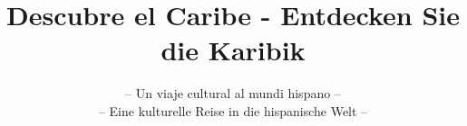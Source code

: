 \documentclass[landscape, pagesize, DIV=15, fontsize=11pt, parskip=half, oneside, BCOR=5mm]{scrartcl}
\begin{document}
\title{Descubre el Caribe - Entdecken Sie die Karibik}
\date{-- Un viaje cultural al mundi hispano -- \\ -- Eine kulturelle Reise in die hispanische Welt --}

\maketitle
\clearpage

\newcommand{\rn}[1]{\Rnode{#1}}
\newcommand{\rl}[2]{\ncline[linestyle=solid,arrows=->,nodesepA=0.5pt,linecolor=gray, strokeopacity=0.5]{#1}{#2}}
\newcommand{\sidenote}[1]{\marginpar[#1]{#1}}
\newcommand{\ul}[1]{\underline{#1}}


\end{document}
